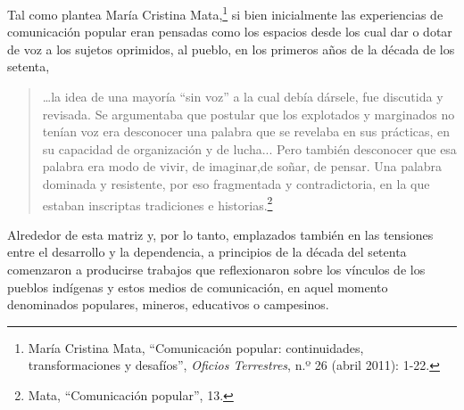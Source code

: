 \documentclass{tufte-handout}
\begin{document}
Tal como plantea María Cristina Mata,\footnote{María Cristina Mata,
  ``Comunicación popular: continuidades, transformaciones y desafíos'',
  \emph{Oficios Terrestres}, n.º 26 (abril 2011): 1-22.} si bien
inicialmente las experiencias de comunicación popular eran pensadas como
los espacios desde los cual dar o dotar de voz a los sujetos oprimidos,
al pueblo, en los primeros años de la década de los setenta,

\begin{quote}
\dots la idea de una mayoría ``sin voz'' a la cual debía dársele, fue
discutida y revisada. Se argumentaba que postular que los explotados y
marginados no tenían voz era desconocer una palabra que se revelaba en
sus prácticas, en su capacidad de organización y de lucha... Pero
también desconocer que esa palabra era modo de vivir, de imaginar,\newpage de
soñar, de pensar. Una palabra dominada y resistente, por eso fragmentada
y contradictoria, en la que estaban inscriptas tradiciones e
historias.\footnote{Mata, ``Comunicación popular'', 13.}
\end{quote}

Alrededor de esta matriz y, por lo tanto, emplazados también en las
tensiones entre el desarrollo y la dependencia, a principios de la
década del setenta comenzaron a producirse trabajos que reflexionaron
sobre los vínculos de los pueblos indígenas y estos medios de
comunicación, en aquel momento denominados populares, mineros,
educativos o campesinos.
\end{document}

